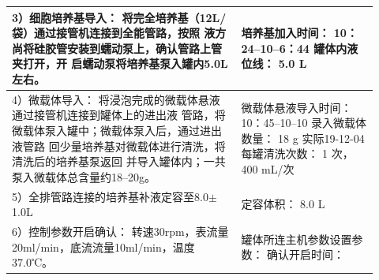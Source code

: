\documentclass[UTF8,10pt,a4paper,fontset=fandol]{ctexart}
\newcommand{\fieldvalue}[1]{#1}
\newcommand{\handwritten}[1]{#1}
\begin{document}
\begin{tabular}{|p{0.58\linewidth}|p{0.34\linewidth}|}
\hline
3）细胞培养基导入：\newline
将完全培养基（12L/袋）通过接管机连接到全能管路，按照
液方尚将硅胶管安装到蠕动泵上，确认管路上管夹打开，开
启蠕动泵将培养基泵入罐内5.0L左右。 &
培养基加入时间：\newline
\fieldvalue{\handwritten{10：24--10--6：44}}\newline
罐体内液位线：\newline
\fieldvalue{\handwritten{5.0}} L
\\
\hline
4）微载体导入：\newline
将浸泡完成的微载体悬液通过接管机连接到罐体上的进出液
管路，将微载体泵入罐中；微载体泵入后，通过进出液管路
回少量培养基对微载体进行清洗，将清洗后的培养基泵返回
并导入罐体内；一共泵入微载体总含量约18--20g。 &
微载体悬液导入时间：\newline
\fieldvalue{\handwritten{10：45--10--10}}\newline
录入微载体数量：\newline
\fieldvalue{\handwritten{18}} g\newline
\handwritten{实际19-12-04}\newline
每罐清洗次数：\newline
\fieldvalue{\handwritten{1}} 次，\newline
\fieldvalue{\handwritten{400}} mL/次
\\
\hline
5）全排管路连接的培养基补液定容至8.0$\pm$1.0L &
定容体积：\newline
\fieldvalue{\handwritten{8.0}} L
\\
\hline
6）控制参数开启确认：\newline
转速30rpm，表流量20ml/min，底流流量10ml/min，温度
37.0℃。 &
罐体所连主机参数设置参数：\newline
确认开启时间：\newline

\end{tabular}
\end{document}
